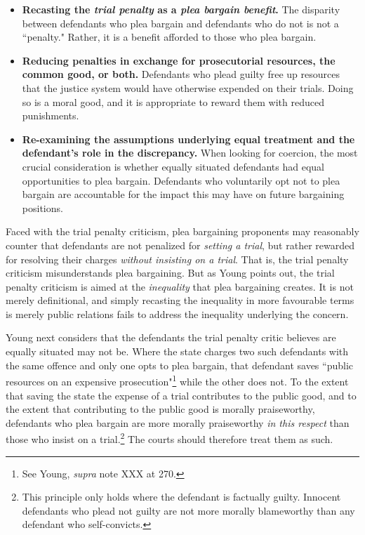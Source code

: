 \begin{itemize}
    \item \textbf{Recasting the \textit{trial penalty} as a \textit{plea bargain benefit}.} The disparity between defendants who plea bargain and defendants who do not is not a ``penalty." Rather, it is a benefit afforded to those who plea bargain.
    \item \textbf{Reducing penalties in exchange for prosecutorial resources, the common good, or both.} Defendants who plead guilty free up resources that the justice system would have otherwise expended on their trials. Doing so is a moral good, and it is appropriate to reward them with reduced punishments.
    \item \textbf{Re-examining the assumptions underlying equal treatment and the defendant's role in the discrepancy.} When looking for coercion, the most crucial consideration is whether equally situated defendants had equal opportunities to plea bargain. Defendants who voluntarily opt not to plea bargain are accountable for the impact this may have on future bargaining positions.
\end{itemize}

Faced with the trial penalty criticism, plea bargaining proponents may reasonably counter that defendants are not penalized for \textit{setting a trial}, but rather rewarded for resolving their charges \textit{without insisting on a trial}. That is, the trial penalty criticism misunderstands plea bargaining. But as Young points out, the trial penalty criticism is aimed at the \textit{inequality} that plea bargaining creates. It is not merely definitional, and simply recasting the inequality in more favourable terms is merely public relations fails to address the inequality underlying the concern. 

Young next considers that the defendants the trial penalty critic believes are equally situated may not be. Where the state charges two such defendants with the same offence and only one opts to plea bargain, that defendant saves ``public resources on an expensive prosecution"\footnote{See Young, \textit{supra} note XXX at 270.} while the other does not. To the extent that saving the state the expense of a trial contributes to the public good, and to the extent that contributing to the public good is morally praiseworthy, defendants who plea bargain are more morally praiseworthy \textit{in this respect} than those who insist on a trial.\footnote{This principle only holds where the defendant is factually guilty. Innocent defendants who plead not guilty are not more morally blameworthy than any defendant who self-convicts.} The courts should therefore treat them as such.

